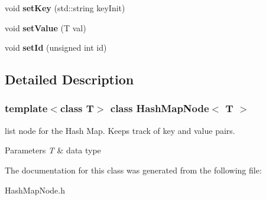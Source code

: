 \begin{DoxyCompactItemize}
\item 
\mbox{\label{class_hash_map_node_acd114aca39f06e753419885d13688dd7}} 
void {\bfseries set\+Key} (std\+::string key\+Init)
\item 
\mbox{\label{class_hash_map_node_a93bad2ab96c6184d71779626f318ac9b}} 
void {\bfseries set\+Value} (T val)
\item 
\mbox{\label{class_hash_map_node_ad68c1cadb91fc1bc47bc8c7b5bf4378c}} 
void {\bfseries set\+Id} (unsigned int id)
\end{DoxyCompactItemize}


\subsection{Detailed Description}
\subsubsection*{template$<$class T$>$\newline
class Hash\+Map\+Node$<$ T $>$}

list node for the Hash Map. Keeps track of key and value pairs. 
\begin{DoxyParams}{Parameters}
{\em T} & data type \\
\hline
\end{DoxyParams}


The documentation for this class was generated from the following file\+:\begin{DoxyCompactItemize}
\item 
Hash\+Map\+Node.\+h\end{DoxyCompactItemize}
